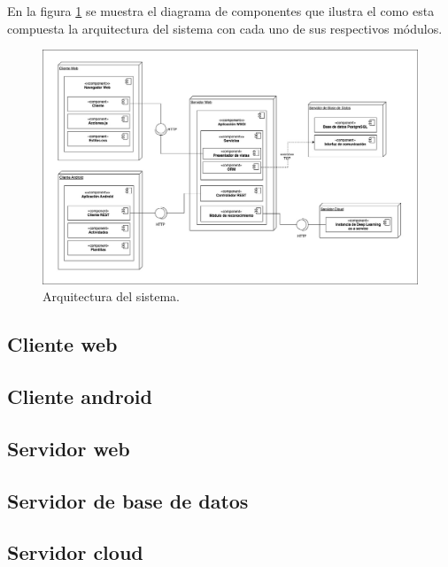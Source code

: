 En la figura \ref{fig:arquitecturaSistema} se muestra el diagrama de componentes que ilustra el como esta compuesta la arquitectura del sistema con cada uno de sus respectivos módulos.

\begin{figure}[h]
    \centering
    \includegraphics[width=\textwidth]{capitulo4/imagenes/ArquitecturaApp.jpg}
    \caption{Arquitectura del sistema.}
    \label{fig:arquitecturaSistema}
\end{figure}
\subsection{Cliente web}
\subsection{Cliente android}
\subsection{Servidor web}
\subsection{Servidor de base de datos}
\subsection{Servidor cloud}